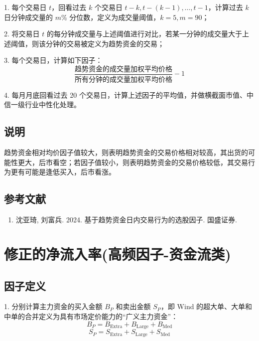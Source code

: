 \documentclass{article}
\begin{document}
1. 每个交易日 \( t \)，回看过去 \( k \) 个交易日 \( t-k, t-(k-1), \ldots, t-1 \)，计算过去 \( k \) 日分钟成交量的 \( m\% \) 分位数，定义为成交量阈值，\( k=5, m=90 \)；

2. 将交易日 \( t \) 的每分钟成交量与上述阈值进行对比，若某一分钟的成交量大于上述阈值，则该分钟的交易被定义为趋势资金的交易；

3. 每个交易日，计算如下因子：
\begin{equation}
    \frac{\text{趋势资金的成交量加权平均价格}}{\text{所有分钟的成交量加权平均价格}} - 1
\end{equation}

4. 每月月底回看过去 20 个交易日，计算上述因子的平均值，并做横截面市值、中信一级行业中性化处理。

\subsection{说明}
趋势资金相对均价因子值较大，则表明趋势资金的交易价格相对较高，其出货的可能性更大，后市看空；若因子值较小，则表明趋势资金的交易价格较低，其交易行为更有可能是逢低买入，后市看涨。

\subsection{参考文献}
\begin{enumerate}
    \item 沈亚琦, 刘富兵. 2024. 基于趋势资金日内交易行为的选股因子. 国盛证券.
\end{enumerate}

\section{修正的净流入率(高频因子-资金流类)}

\subsection{因子定义}

1. 分别计算主力资金的买入金额 \( B_P \) 和卖出金额 \( S_P \)，即 Wind 的超大单、大单和中单的合并定义为具有市场定价能力的“广义主力资金”：
\begin{equation}
    B_P = B_{\mathrm{Extra}} + B_{\mathrm{Large}} + B_{\mathrm{Med}}
\end{equation}
\begin{equation}
    S_P = S_{\mathrm{Extra}} + S_{\mathrm{Large}} + S_{\mathrm{Med}}
\end{equation}
\end{document}
